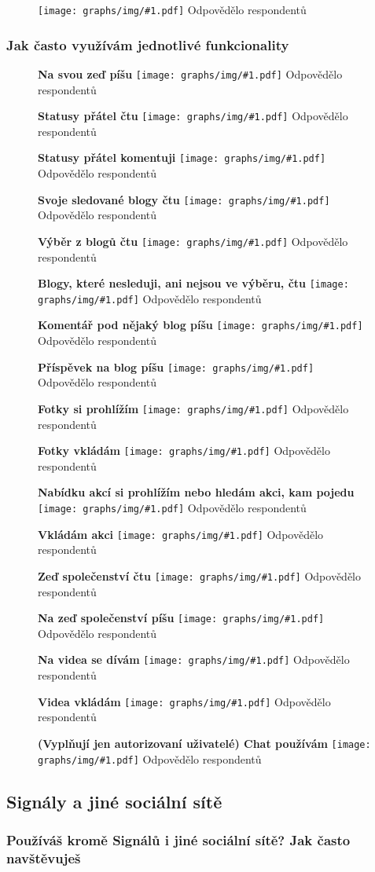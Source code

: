 \documentclass[12pt, a4paper, twoside]{article}
\newcommand{\answercount}[1]{Odpovědělo  respondentů}
\newcommand{\includegraph}[2]{
  \begin{figure}[H]
    \centering
    \textbf{#2}
    \texttt{[image: graphs/img/\#1.pdf]}
    \answercount{#1}
  \end{figure}
}
\begin{document}
\includegraph{jsem_autorizovany}{}

\subsubsection{Jak často využívám jednotlivé funkcionality}

\includegraph{funkcionality_status_pisu}{Na svou zeď píšu}

\includegraph{funkcionality_status_ctu}{Statusy přátel čtu}

\includegraph{funkcionality_status_komentuji}{Statusy přátel komentuji}

\includegraph{funkcionality_sledovane_blogy_ctu}{Svoje sledované blogy čtu}

\includegraph{funkcionality_blogy_vyber_ctu}{Výběr z blogů čtu}

\includegraph{funkcionality_blogy_nesledovane_ctu}{Blogy, které nesleduji, ani nejsou ve výběru, čtu}

\includegraph{funkcionality_blog_komentuji}{Komentář pod nějaký blog píšu}

\includegraph{funkcionality_blog_pisu}{Příspěvek na blog píšu}

\includegraph{funkcionality_fotky_prohlizim}{Fotky si prohlížím}

\includegraph{funkcionality_fotky_vkladam}{Fotky vkládám}

\includegraph{funkcionality_akce_prohlizim}{Nabídku akcí si prohlížím nebo hledám akci, kam pojedu}

\includegraph{funkcionality_akce_vkladam}{Vkládám akci}

\includegraph{funkcionality_zed_spolecenstvi_ctu}{Zeď společenství čtu}

\includegraph{funkcionality_zed_spolecenstvi_pisu}{Na zeď společenství píšu}

\includegraph{funkcionality_videa_prohlizim}{Na videa se dívám}

\includegraph{funkcionality_videa_vkladam}{Videa vkládám}

\includegraph{funkcionality_autorizovani_chat}{(Vyplňují jen autorizovaní uživatelé) Chat používám}

\subsection{Signály a jiné sociální sítě}\label{sec:jinesite}

\subsubsection{Používáš kromě Signálů i jiné sociální sítě? Jak často navštěvuješ}
\end{document}
